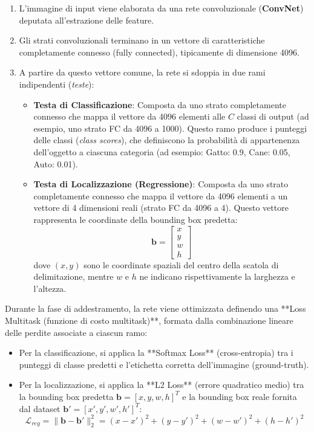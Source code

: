 ﻿\documentclass[11pt, a4paper]{article}
\begin{document}
\begin{enumerate}[noitemsep]
    \item L'immagine di input viene elaborata da una rete convoluzionale (\textbf{ConvNet}) deputata all'estrazione delle feature.
    \item Gli strati convoluzionali terminano in un vettore di caratteristiche completamente connesso (fully connected), tipicamente di dimensione 4096.
    \item A partire da questo vettore comune, la rete si sdoppia in due rami indipendenti (\emph{teste}):
    \begin{itemize}[noitemsep]
        \item \textbf{Testa di Classificazione}: Composta da uno strato completamente connesso che mappa il vettore da 4096 elementi alle $C$ classi di output (ad esempio, uno strato FC da 4096 a 1000). Questo ramo produce i punteggi delle classi (\emph{class scores}), che definiscono la probabilità di appartenenza dell'oggetto a ciascuna categoria (ad esempio: Gatto: 0.9, Cane: 0.05, Auto: 0.01).
        \item \textbf{Testa di Localizzazione (Regressione)}: Composta da uno strato completamente connesso che mappa il vettore da 4096 elementi a un vettore di 4 dimensioni reali (strato FC da 4096 a 4). Questo vettore rappresenta le coordinate della bounding box predetta:
        \[
        \bm{b} = \begin{bmatrix} x \\ y \\ w \\ h \end{bmatrix}
        \]
        dove $(x, y)$ sono le coordinate spaziali del centro della scatola di delimitazione, mentre $w$ e $h$ ne indicano rispettivamente la larghezza e l'altezza.
    \end{itemize}
\end{enumerate}


Durante la fase di addestramento, la rete viene ottimizzata definendo una **Loss Multitask (funzione di costo multitask)**, formata dalla combinazione lineare delle perdite associate a ciascun ramo:

\begin{itemize}[noitemsep]
    \item Per la classificazione, si applica la **Softmax Loss** (cross-entropia) tra i punteggi di classe predetti e l'etichetta corretta dell'immagine (ground-truth).
    \item Per la localizzazione, si applica la **L2 Loss** (errore quadratico medio) tra la bounding box predetta $\bm{b} = [x, y, w, h]^T$ e la bounding box reale fornita dal dataset $\bm{b}' = [x', y', w', h']^T$:
    \[
    \mathcal{L}_{reg} = \|\bm{b} - \bm{b}'\|_2^2 = (x - x')^2 + (y - y')^2 + (w - w')^2 + (h - h')^2
    \]
\end{itemize}
\end{document}
